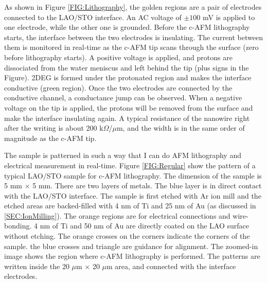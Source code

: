 \documentclass[pdflatex, sectionletters, 12pt]{pittetd}    %
\begin{document}
As shown in Figure \ref{FIG:Lithography}, the golden regions are a pair of electrodes connected to the LAO/STO interface. An AC voltage of $\pm100$ mV is applied to one electrode, while the other one is grounded. Before the c-AFM lithography starts, the interface between the two electrodes is insulating. The current between them is monitored in real-time as the c-AFM tip scans through the surface (zero before lithography starts). A positive voltage is applied, and protons are dissociated from the water meniscus and left behind the tip (plus signs in the Figure). 2DEG is formed under the protonated region and makes the interface conductive (green region). Once the two electrodes are connected by the conductive channel, a conductance jump can be observed. When a negative voltage on the tip is applied, the protons will be removed from the surface and make the interface insulating again. A typical resistance of the nanowire right after the writing is about 200 k$\Omega$/$\mu$m, and the width is in the same order of magnitude as the c-AFM tip\cite{cen2008nanoscale}.

The sample is patterned in such a way that I can do AFM lithography and electrical measurement in real-time. Figure \ref{FIG:Regular} show the pattern of a typical LAO/STO sample for c-AFM lithography. The dimension of the sample is 5 mm $\times$ 5 mm. There are two layers of metals. The blue layer is in direct contact with the LAO/STO interface. The sample is first etched with Ar ion mill and the etched areas are backed-filled with 4 nm of Ti and 25 nm of Au (as discussed in \ref{SEC:IonMilling}). The orange regions are for electrical connections and wire-bonding. 4 nm of Ti and 50 nm of Au are directly coated on the LAO surface without etching. The orange crosses on the corners indicate the corners of the sample. the blue crosses and triangle are guidance for alignment. The zoomed-in image shows the region where c-AFM lithography is performed. The patterns are written inside the 20 $\mu$m $\times$ 20 $\mu$m area, and connected with the interface electrodes.

\end{document}
